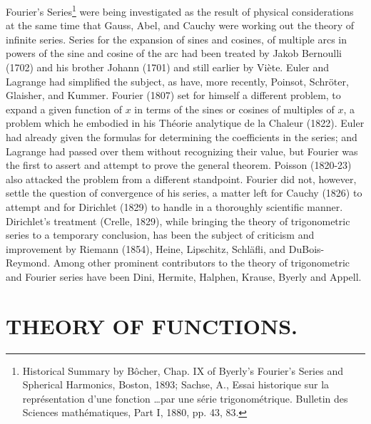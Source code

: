 \documentclass[oneside]{book}
\begin{document}
{Fourier's Series\footnote{Historical Summary by B\^ocher, Chap. IX
of Byerly's Fourier's Series and Spherical Harmonics, Boston, 1893;
Sachse, A., Essai historique sur la repr\'esentation d'une fonction
\ldots par une s\'erie trigonom\'etrique. Bulletin des Sciences
math\'ematiques, Part I, 1880, pp. 43, 83.} were being investigated
as the result of physical considerations at the same time that
Gauss, Abel, and Cauchy were working out the theory of infinite
series. Series for the expansion of sines and cosines, of multiple
arcs in powers of the sine and cosine of the arc had been treated by
Jakob Bernoulli (1702) and his brother Johann (1701) and still
earlier by Vi\`ete. Euler and Lagrange had simplified the subject,
as have, more recently, Poinsot, Schr\"oter, Glaisher, and
Kummer. Fourier (1807) set for himself a different problem, to
expand a given function of $x$ in terms of the sines or cosines of
multiples of $x$, a problem which he embodied in his Th\'eorie
analytique de la Chaleur (1822). Euler had already given the
formulas for determining the coefficients in the series; and
Lagrange had passed over them without recognizing their value, but
Fourier was the first to assert and attempt to prove the general
theorem. Poisson (1820-23) also attacked the problem from a
different standpoint. Fourier did not, however, settle the question
of convergence of his series, a matter left for Cauchy (1826) to
attempt and for Dirichlet (1829) to handle in a thoroughly
scientific manner. Dirichlet's treatment (Crelle, 1829), while
bringing the theory of trigonometric series to a temporary
conclusion, has been the subject of criticism and improvement by
Riemann (1854), Heine, Lipschitz, Schl\"afli, and
DuBois-Reymond. Among other prominent contributors to the theory of
trigonometric and Fourier series have been Dini, Hermite, Halphen,
Krause, Byerly and Appell.

\chapter{THEORY OF FUNCTIONS.}

}
\end{document}
